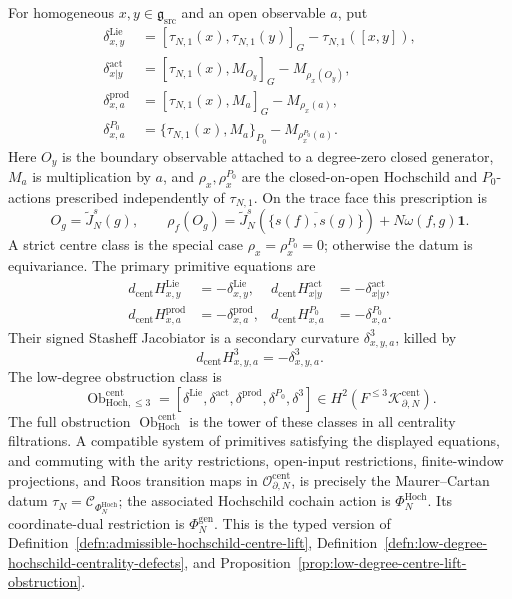 \begin{defn}
For homogeneous \(x,y\in\mathfrak g_{\mathrm{src}}\) and an open
observable \(a\),
put
\[
  \begin{aligned}
  \delta^{\mathrm{Lie}}_{x,y}
    &=[\tau_{N,1}(x),\tau_{N,1}(y)]_G
      -\tau_{N,1}([x,y]),\\
  \delta^{\mathrm{act}}_{x|y}
    &=[\tau_{N,1}(x),M_{O_y}]_G-M_{\rho_x(O_y)},\\
  \delta^{\mathrm{prod}}_{x,a}
    &=[\tau_{N,1}(x),M_a]_G-M_{\rho_x(a)},\\
  \delta^{P_0}_{x,a}
    &=\{\tau_{N,1}(x),M_a\}_{P_0}
      -M_{\rho_x^{P_0}(a)} .
  \end{aligned}
\]
Here \(O_y\) is the boundary observable attached to a degree-zero
closed generator, \(M_a\) is multiplication by \(a\), and
\(\rho_x,\rho_x^{P_0}\) are the closed-on-open Hochschild and
\(P_0\)-actions prescribed independently of \(\tau_{N,1}\).  On the
trace face this prescription is
\[
  O_g=\widetilde J_N^s(g),\qquad
  \rho_f(O_g)
    =\widetilde J_N^s\!\left(
       \overline{\{s(f),s(g)\}}\right)
      +N\omega(f,g)\mathbf1 .
\]
A strict centre class is the special case
\(\rho_x=\rho_x^{P_0}=0\); otherwise the datum is equivariance.
The primary primitive equations are
\[
  \begin{aligned}
  d_{\mathrm{cent}}H^{\mathrm{Lie}}_{x,y}
    &=-\delta^{\mathrm{Lie}}_{x,y},&
  d_{\mathrm{cent}}H^{\mathrm{act}}_{x|y}
    &=-\delta^{\mathrm{act}}_{x|y},\\
  d_{\mathrm{cent}}H^{\mathrm{prod}}_{x,a}
    &=-\delta^{\mathrm{prod}}_{x,a},&
  d_{\mathrm{cent}}H^{P_0}_{x,a}
    &=-\delta^{P_0}_{x,a}.
  \end{aligned}
\]
Their signed Stasheff Jacobiator is a secondary curvature
\(\delta^3_{x,y,a}\), killed by
\[
  d_{\mathrm{cent}}H^3_{x,y,a}=-\delta^3_{x,y,a}.
\]
The low-degree obstruction class is
\[
  \operatorname{Ob}^{\mathrm{cent}}_{\mathrm{Hoch},\le3}
  =
  [\delta^{\mathrm{Lie}},
    \delta^{\mathrm{act}},
    \delta^{\mathrm{prod}},
    \delta^{P_0},
    \delta^3]
  \in
  H^2\!\left(F^{\le3}\mathcal K^{\mathrm{cent}}_{\partial,N}\right).
\]
The full obstruction
\(\operatorname{Ob}^{\mathrm{cent}}_{\mathrm{Hoch}}\) is the tower of
these classes in all centrality filtrations.  A compatible system of
primitives satisfying the displayed equations, and commuting with the
arity restrictions, open-input restrictions, finite-window projections,
and Roos transition maps in
\(\mathcal O^{\mathrm{cent}}_{\partial,N}\), is precisely the
Maurer--Cartan datum
\(\tau_N=\mathcal C_{\Phi_N^{\mathrm{Hoch}}}\); the associated
Hochschild cochain action is \(\Phi_N^{\mathrm{Hoch}}\).  Its
coordinate-dual restriction is \(\Phi_N^{\mathrm{gen}}\).  This is the typed
version of
Definition~\ref{defn:admissible-hochschild-centre-lift},
Definition~\ref{defn:low-degree-hochschild-centrality-defects}, and
Proposition~\ref{prop:low-degree-centre-lift-obstruction}.
\end{defn}

